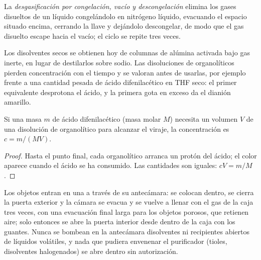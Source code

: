 \begin{definition}\label{def:b3:lab-techniques-3:degassing}
La \emph{desgasificación por congelación, vacío y descongelación} elimina
los gases disueltos de un líquido congelándolo en nitrógeno líquido, evacuando el
espacio situado encima, cerrando la llave y dejándolo descongelar, de modo que el gas disuelto escape
hacia el vacío; el ciclo se repite tres veces.
\end{definition}

Los disolventes secos se obtienen hoy de columnas de alúmina activada bajo gas inerte,
en lugar de destilarlos sobre sodio. Las disoluciones de organolíticos pierden concentración con el
tiempo y se valoran antes de usarlas, por ejemplo frente a una cantidad pesada de
ácido difenilacético en THF seco: el primer equivalente desprotona el ácido, y la
primera gota en exceso da el dianión amarillo.

\begin{proposition}\label{prop:b3:lab-techniques-3:titre}
Si una masa $m$ de ácido difenilacético (masa molar $M$) necesita un volumen $V$ de una
disolución de organolítico para alcanzar el viraje, la concentración es $c = m/(MV)$.
\end{proposition}

\begin{proof}
Hasta el punto final, cada organolítico arranca un protón del ácido; el
color aparece cuando el ácido se ha consumido. Las cantidades son iguales: $cV = m/M$.
\end{proof}

\begin{inthelab}
Los objetos entran en una  a través de su antecámara: se colocan dentro, se
cierra la puerta exterior y la cámara se evacua y se vuelve a llenar con el gas de la caja
tres veces, con una evacuación final larga para los objetos porosos, que retienen aire;
solo entonces se abre la puerta interior desde dentro de la caja con los guantes. Nunca se bombean en la antecámara
disolventes ni recipientes abiertos de líquidos volátiles, y
nada que pudiera envenenar el purificador (tioles, disolventes halogenados) se abre
dentro sin autorización.
\end{inthelab}

